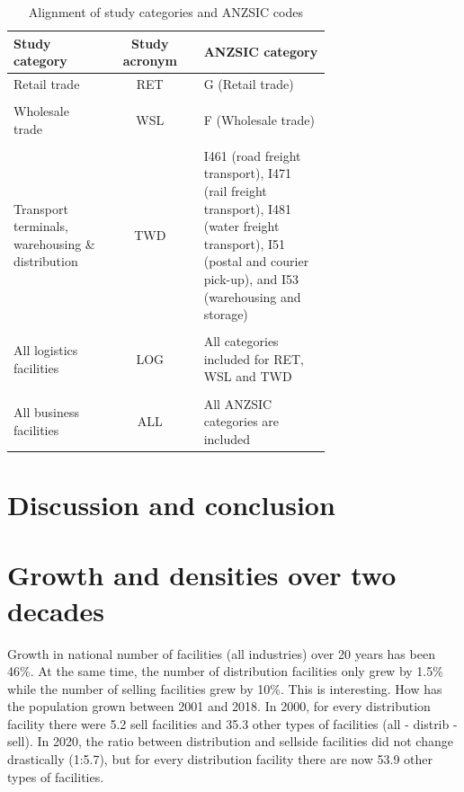 \documentclass[3p, a4paper, authoryear, 11pt, fleqn, review]{elsarticle}
\newcommand{\nmt}[1]{{\color{ForestGreen}{~(nmt: #1)}}}
\begin{document}
\begin{table}[!h]
\caption{Alignment of study categories and ANZSIC codes}\label{tab:Codes}
\begin{tabular}{L{0.3\linewidth} c L{0.4\linewidth}}
\toprule
Study category & Study acronym & ANZSIC category\\
\midrule
Retail trade & RET & G (Retail trade)\\
\\
Wholesale trade & WSL & F (Wholesale trade)\\
\\
Transport terminals, warehousing \& distribution & TWD & I461 (road freight transport), I471 (rail freight transport), I481 (water freight transport), I51 (postal and courier pick-up), and I53 (warehousing and storage)\\ \\
All logistics facilities & LOG & All categories included for RET, WSL and TWD\\ \\
All business facilities & ALL & All ANZSIC categories are included\\
\bottomrule
\end{tabular}
\end{table}


\section{Discussion and conclusion}
\label{sec:DiscConc}

\nmt{Remember to highlight methodological novelties}

\section{Growth and densities over two decades}

Growth in national number of facilities (all industries) over 20 years has been 46\%. At the same time, the number of distribution facilities only grew by 1.5\% while the number of selling facilities grew by 10\%. This is interesting. How has the population grown between 2001 and 2018. In 2000, for every distribution facility there were 5.2 sell facilities and 35.3 other types of facilities (all - distrib - sell). In 2020, the ratio between distribution and sellside facilities did not change drastically (1:5.7), but for every distribution facility there are now 53.9 other types of facilities. \nmt{What is the significance of that?} 
\end{document}
